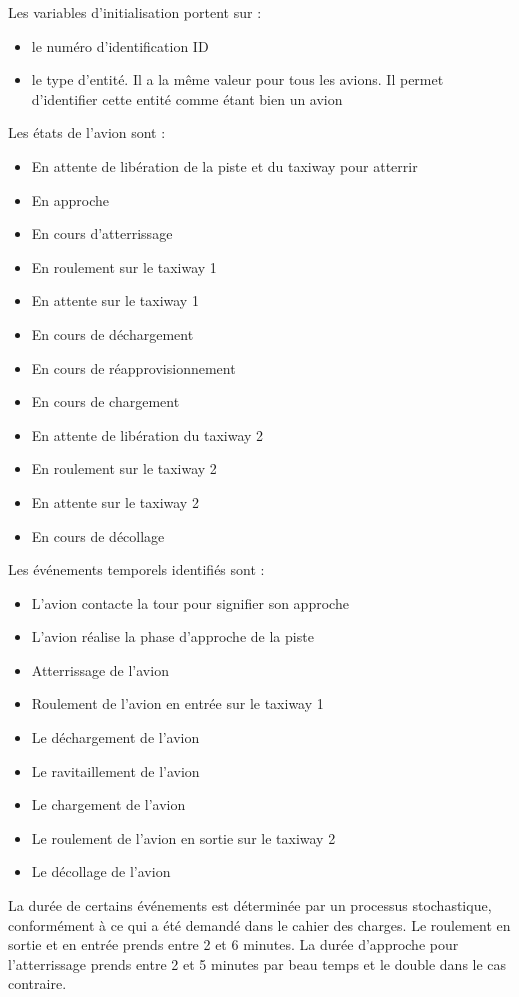 Les variables d'initialisation portent sur :
\begin{itemize}[label=--]
\item le numéro d'identification ID
\item le type d'entité. Il a la même valeur pour tous les avions. Il permet d'identifier cette entité comme étant bien un avion
\end{itemize}
Les états de l'avion sont :
\begin{itemize}[label=--]
\item En attente de libération de la piste et du taxiway pour atterrir
\item En approche
\item En cours d'atterrissage
\item En roulement sur le taxiway 1
\item En attente sur le taxiway 1
\item En cours de déchargement 
\item En cours de réapprovisionnement
\item En cours de chargement
\item En attente de libération du taxiway 2
\item En roulement sur le taxiway 2
\item En attente sur le taxiway 2
\item En cours de décollage
\end{itemize}
Les événements temporels identifiés sont :
\begin{itemize}[label=--]
\item L'avion contacte la tour pour signifier son approche
\item L'avion réalise la phase d'approche de la piste
\item Atterrissage de l'avion
\item Roulement de l'avion en entrée sur le taxiway 1
\item Le déchargement de l'avion
\item Le ravitaillement de l'avion
\item Le chargement de l'avion
\item Le roulement de l'avion en sortie sur le taxiway 2
\item Le décollage de l'avion
\end{itemize}

La durée de certains événements est déterminée par un processus stochastique, conformément à ce qui a été demandé dans le cahier des charges. Le roulement en sortie et en entrée prends entre 2 et 6 minutes. La durée d'approche pour l'atterrissage prends entre 2 et 5 minutes par beau temps et le double dans le cas contraire.

